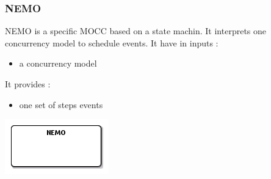 \documentclass{gemoc} %
\begin{document}
\subsubsection{NEMO}
\label{sec:NEMO}

NEMO is a specific MOCC based on a state machin. It interprets one concurrency model to schedule events.
\newline It have in inputs :
\begin{itemize}
\item a concurrency model
\end{itemize}
It provides :
\begin{itemize}
\item one set of steps events
\end{itemize}
\begin{center}
\includegraphics*[trim=0.0cm 0.0cm 0cm 0.0cm, clip=true]{../images/generated/Generated_NEMO.png}
\end{center}
\end{document}
